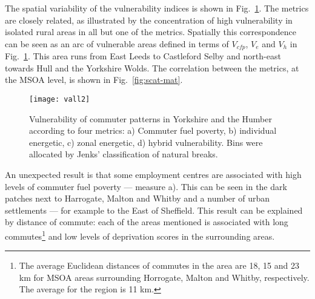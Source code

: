 % 
The spatial variability of the vulnerability indices is shown in
Fig.~\ref{fig:ve}.
The metrics are closely related, as illustrated by the concentration of
high vulnerability in isolated rural areas in all but one of the metrics.
Spatially this correspondence can be seen as an arc of vulnerable areas
defined in terms of $V_{cfp}$, $V_e$ and $V_h$ in Fig.~\ref{fig:ve}.  This
area runs from East Leeds to Castleford Selby and north-east towards Hull and
the Yorkshire Wolds.
The correlation between the metrics, at the MSOA level, is shown in
Fig.~\ref{fig:scat-mat}.


\begin{figure}[pth]
 \centering
\texttt{[image: vall2]}
 \caption[Vulnerability of commuter patterns in Yorkshire and the Humber]
 {Vulnerability of commuter patterns in Yorkshire and the Humber
according to four metrics: a) Commuter fuel poverty, b) individual
energetic, c) zonal energetic, d) hybrid vulnerability. Bins
were allocated by Jenks' classification of natural breaks.}
 \label{fig:ve}
\end{figure}

An unexpected result is that some employment centres are associated
with high levels of commuter fuel poverty --- measure a).
This can be seen in the dark patches next to Harrogate, Malton and Whitby
and a number of urban settlements --- for example to the East of Sheffield.
This result can be explained by distance of commute: each of the areas mentioned
is associated with long commutes\footnote{The average Euclidean distances
of commutes in the area are 18, 15 and 23 km for MSOA areas surrounding
Horrogate, Malton and Whitby, respectively. The average for the region
is 11 km.}  and low levels of deprivation
scores in the surrounding areas.

